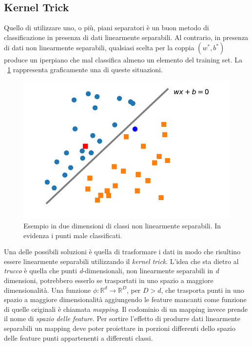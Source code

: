 \documentclass [11pt,a4paper,twoside,openright] {book}
\begin{document}
\subsection{Kernel Trick}
Quello di utilizzare uno, o più, piani separatori è un buon metodo di classificazione in presenza di dati linearmente separabili. Al contrario, in presenza di dati non linearmente separabili, qualsiasi scelta per la coppia $(w^*, b^*)$ produce un iperpiano che mal classifica almeno un elemento del training set. La  \figurename~\ref{nonseparabili} rappresenta graficamente una di queste situazioni.\\
\begin{figure}[!h]
\centering
\includegraphics[scale=.6]{figure/nonseparabili.pdf}
\caption{Esempio in due dimensioni di classi non linearmente separabili. In evidenza i punti male classificati. \label{nonseparabili}}
\end{figure}Una delle possibili soluzioni è quella di trasformare i dati in modo che risultino essere linearmente separabili utilizzando il \textit{kernel trick}. L'idea che sta dietro al \textit{trucco} è quella che punti \textit{d}-dimensionali, non linearmente separabili in \textit{d} dimensioni, potrebbero esserlo se trasportati in uno spazio a maggiore dimensionalità. Una funzione $\phi: \mathbb{R}^d \rightarrow \mathbb{R}^D$, per $D > d$, che trasporta punti in uno spazio a maggiore dimensionalità aggiungendo le feature mancanti come funzione di quelle originali è chiamata \textit{mapping}. Il codominio di un mapping invece prende il nome di \textit{spazio delle feature}. Per sortire l'effetto di produrre dati linearmente separabili un mapping deve poter proiettare in porzioni differenti dello spazio delle feature punti appartenenti a differenti classi.\\\\
\end{document}
